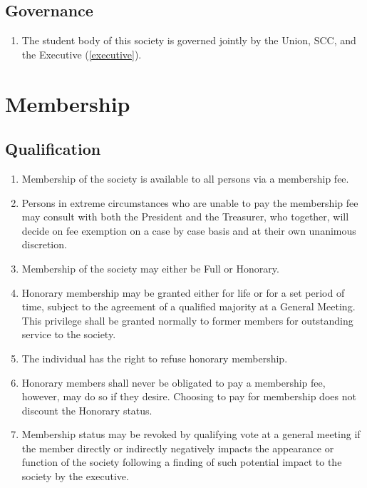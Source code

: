 \documentclass[parskip=half]{scrartcl}
\begin{document}
        \subsection{Governance}
            \label{general--governance}
            \begin{enumerate}
                \item The student body of this society is governed jointly by the Union, SCC, and the Executive (\ref{executive}).
            \end{enumerate}

    \clearpage
    \section{Membership}
        \label{membership}
        \subsection{Qualification}
            \label{membership--qualification}
            \begin{enumerate}
                \item Membership of the society is available to all persons via a membership fee.
                
                \item Persons in extreme circumstances who are unable to pay the membership fee may consult with both the President and the Treasurer, who together, will decide on fee exemption on a case by case basis and at their own unanimous discretion.

                \item Membership of the society may either be Full or Honorary.
                
                \item Honorary membership may be granted either for life or for a set period of time, subject to the agreement of a qualified majority at a General Meeting. This privilege shall be granted normally to former members for outstanding service to the society.
                
                \item The individual has the right to refuse honorary membership.
                
                \item Honorary members shall never be obligated to pay a membership fee, however, may do so if they desire. Choosing to pay for membership does not discount the Honorary status.
                
                \item Membership status may be revoked by qualifying vote at a general meeting if the member directly or indirectly negatively impacts the appearance or function of the society following a finding of such potential impact to the society by the executive.
            \end{enumerate}
            
\end{document}
